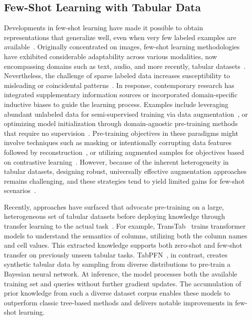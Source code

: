 \subsection{Few-Shot Learning with Tabular Data} Developments in few-shot learning have made it possible to obtain representations that generalize well, even when very few labeled examples are available~\cite{chen2018closer}. Originally concentrated on images, few-shot learning methodologies have exhibited considerable adaptability across various modalities, now encompassing domains such as text, audio, and more recently, tabular datasets~\cite{majumder2022few,nam2023stunt,schick2021exploiting}. Nevertheless, the challenge of sparse labeled data increases susceptibility to misleading or coincidental patterns~\cite{bartlett2021deep}. In response, contemporary research has integrated supplementary information sources or incorporated domain-specific inductive biases to guide the learning process. Examples include leveraging abundant unlabeled data for semi-supervised training via data augmentation~\cite{ucar2021subtab,yoon2020vime}, or optimizing model initialization through domain-agnostic pre-training methods that require no supervision~\cite{somepalli2021saint}. Pre-training objectives in these paradigms might involve techniques such as masking or intentionally corrupting data features followed by reconstruction~\cite{arik2021tabnet,majmundar2022met}, or utilizing augmented samples for objectives based on contrastive learning~\cite{bahri2022scarf,chen2020simple}. However, because of the inherent heterogeneity in tabular datasets, designing robust, universally effective augmentation approaches remains challenging, and these strategies tend to yield limited gains for few-shot scenarios~\cite{nam2023stunt}.

Recently, approaches have surfaced that advocate pre-training on a large, heterogeneous set of tabular datasets before deploying knowledge through transfer learning to the actual task~\cite{zhang2023generative,levin2022transfer,zhu2023xtab}. For example, TransTab~\cite{wang2022transtab} trains transformer models to understand the semantics of columns, utilizing both the column names and cell values. This extracted knowledge supports both zero-shot and few-shot transfer on previously unseen tabular tasks. TabPFN~\cite{hollmann2022tabpfn}, in contrast, creates synthetic tabular data by sampling from diverse distributions to pre-train a Bayesian neural network. At inference, the model processes both the available training set and queries without further gradient updates. The accumulation of prior knowledge from such a diverse dataset corpus enables these models to outperform classic tree-based methods and delivers notable improvements in few-shot learning.

